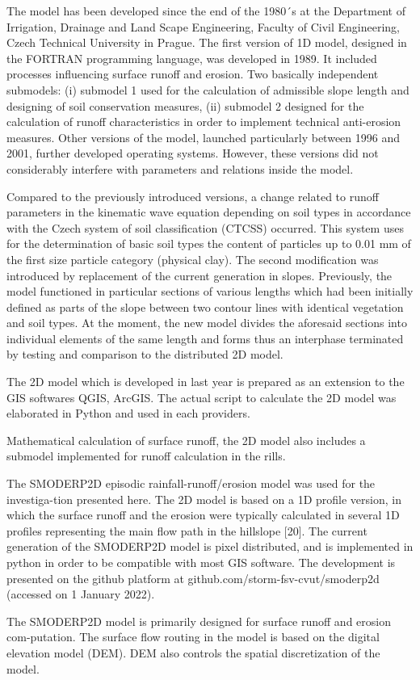 The model has been developed since the end of the 1980´s at the Department of
Irrigation, Drainage and Land Scape Engineering, Faculty of Civil Engineering,
Czech Technical University in Prague. The first version of 1D model, designed
in the FORTRAN programming language, was developed in 1989. It included
processes influencing surface runoff and erosion. Two basically independent
submodels: (i) submodel 1 used for the calculation of admissible slope length
and designing of soil conservation measures, (ii) submodel 2 designed for the
calculation of runoff characteristics in order to implement technical
anti-erosion measures. Other versions of the model, launched particularly
between 1996 and 2001, further developed operating systems. However, these
versions did not considerably interfere with parameters and relations inside
the model.  

Compared to the previously introduced versions, a change related to runoff
parameters in the kinematic wave equation depending on soil types in accordance
with the Czech system of soil classification (CTCSS) occurred. This system uses
for the determination of basic soil types the content of particles up to 0.01
mm of the first size particle category (physical clay). The second modification
was introduced by replacement of the current generation in slopes. Previously,
the model functioned in particular sections of various lengths which had been
initially defined as parts of the slope between two contour lines with
identical vegetation and soil types. At the moment, the new model divides the
aforesaid sections into individual elements of the same length and forms thus
an interphase terminated by testing and comparison to the distributed 2D model. 

The 2D model which is developed in last year is prepared as an extension to the
GIS softwares QGIS, ArcGIS. The actual script to calculate the 2D model was
elaborated in Python and used in each providers.  

Mathematical calculation of surface runoff, the 2D model also includes a
submodel implemented for runoff calculation in the rills. 

The SMODERP2D episodic rainfall-runoff/erosion model was used for the
investiga-tion presented here. The 2D model is based on a 1D profile version,
in which the surface runoff and the erosion were typically calculated in
several 1D profiles representing the main flow path in the hillslope [20]. The
current generation of the SMODERP2D model is pixel distributed, and is
implemented in python in order to be compatible with most GIS software. The
development is presented on the github platform at
github.com/storm-fsv-cvut/smoderp2d (accessed on 1 January 2022). 

The SMODERP2D model is primarily designed for surface runoff and erosion
com-putation. The surface flow routing in the model is based on the digital
elevation model (DEM). DEM also controls the spatial discretization of the
model. 
